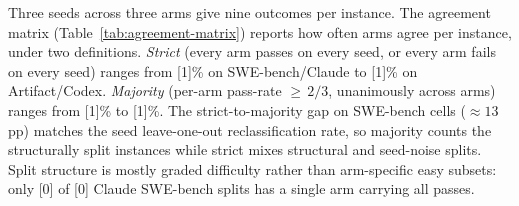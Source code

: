 Three seeds across three arms give nine outcomes per instance. The
agreement matrix (Table~\ref{tab:agreement-matrix}) reports how often
arms agree per instance, under two definitions. \emph{Strict} (every
arm passes on every seed, or every arm fails on every seed) ranges from
[1]\% on
SWE-bench/Claude to
[1]\% on
Artifact/Codex. \emph{Majority} (per-arm pass-rate ${\geq}\,2/3$,
unanimously across arms) ranges from
[1]\% to
[1]\%.
The strict-to-majority gap on SWE-bench cells (${\approx}13$\,pp) matches
the seed leave-one-out reclassification rate, so majority counts the
structurally split instances while strict mixes structural and
seed-noise splits. Split structure is mostly graded difficulty rather
than arm-specific easy subsets: only
[0]
of [0]
Claude SWE-bench splits has a single arm carrying all passes.

